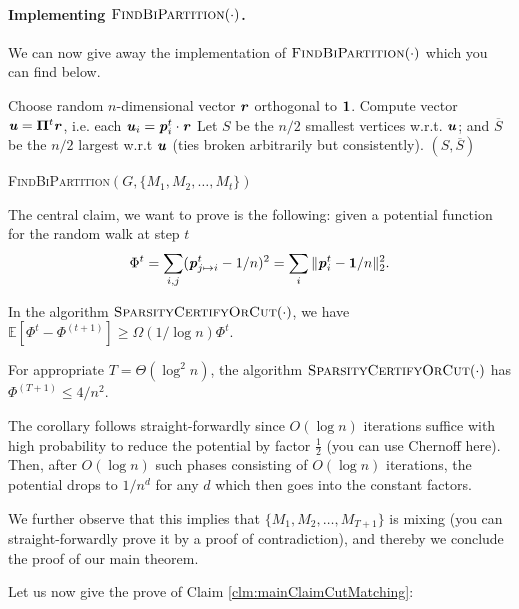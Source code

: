 \paragraph{Implementing $\textsc{FindBiPartition}(\cdot)$.} We can now give away the implementation of $\textsc{FindBiPartition}(\cdot)$ which you can find below.

\begin{algorithm}[H]
    Choose random $n$-dimensional vector $\boldsymbol{\mathit{r}}$ orthogonal to $\boldsymbol{1}$.\;
    Compute vector $\boldsymbol{\mathit{u}} = \boldsymbol{\Pi}^t \boldsymbol{\mathit{r}}$, i.e. each $\boldsymbol{\mathit{u}}_i = \boldsymbol{\mathit{p}}_i^t \cdot \boldsymbol{\mathit{r}}$\;
    Let $S$ be the $n/2$ smallest vertices w.r.t. $\boldsymbol{\mathit{u}}$; and $\overline{S}$ be the $n/2$ largest w.r.t $\boldsymbol{\mathit{u}}$ (ties broken arbitrarily but consistently).\;
    \Return $(S, \overline{S})$
  \caption{\textsc{FindBiPartition}$(G, \{M_1, M_2, \dots, M_t\})$}
  \label{algo:findBiPartition}
\end{algorithm}

The central claim, we want to prove is the following: given a potential function for the random walk at step $t$
\[
    \Phi^t = \sum_{i,j} (\boldsymbol{\mathit{p}}_{j \mapsto i}^t - 1/n)^2 = \sum_{i} \|\boldsymbol{\mathit{p}}_{i}^t - \boldsymbol{1}/n\|_2^2.
\]
\begin{claim}\label{clm:mainClaimCutMatching}
In the algorithm $\textsc{SparsityCertifyOrCut}(\cdot)$, we have $\mathbb{E}[\Phi^{t} - \Phi^{(t+1)}] \geq \Omega(1/\log n) \Phi^{t}$.
\end{claim}
\begin{corollary}
For appropriate $T = \Theta(\log^2 n)$, the algorithm $\textsc{SparsityCertifyOrCut}(\cdot)$ has $\Phi^{(T+1)} \leq 4/n^2$.
\end{corollary}

The corollary follows straight-forwardly since $O(\log n)$ iterations suffice with high probability to reduce the potential by factor $\frac{1}{2}$ (you can use Chernoff here). Then, after $O(\log n)$ such phases consisting of $O(\log n)$ iterations, the potential drops to $1/n^d$ for any $d$ which then goes into the constant factors.

We further observe that this implies that $\{M_1, M_2, \dots, M_{T+1}\}$ is mixing (you can straight-forwardly prove it by a proof of contradiction), and thereby we conclude the proof of our main theorem. 

Let us now give the prove of Claim \ref{clm:mainClaimCutMatching}: 

